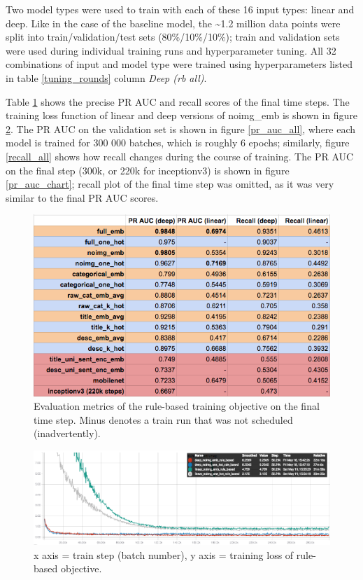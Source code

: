 Two model types were used to train with each of these 16 input types: linear and deep.
Like in the case of the baseline model, the \textasciitilde1.2 million data points were split into train/validation/test sets (80\%/10\%/10\%); train and validation sets were used during individual training runs and hyperparameter tuning.
All 32 combinations of input and model type were trained using hyperparameters listed in table \ref{tuning_rounds} column \textit{Deep (rb all)}.

Table \ref{metrics_all} shows the precise PR AUC and recall scores of the final time steps.
The training loss function of linear and deep versions of noimg\_emb is shown in figure \ref{train_loss_all}.
The PR AUC on the validation set is shown in figure \ref{pr_auc_all}, where each model is trained for 300 000 batches, which is roughly 6 epochs; similarly, figure \ref{recall_all} shows how recall changes during the course of training.
The PR AUC on the final step (300k, or 220k for inceptionv3) is shown in figure \ref{pr_auc_chart}; recall plot of the final time step was omitted, as it was very similar to the final PR AUC scores.

\begin{figure}
  \includegraphics[width=\linewidth]{figures/metrics_all}
  \caption{Evaluation metrics of the rule-based training objective on the final time step. Minus denotes a train run that was not scheduled (inadvertently).}
  \label{metrics_all}
\end{figure}

\begin{figure}
  \includegraphics[width=\linewidth]{figures/train_loss_all}
  \caption{x axis = train step (batch number), y axis = training loss of rule-based objective.}
  \label{train_loss_all}
\end{figure}

